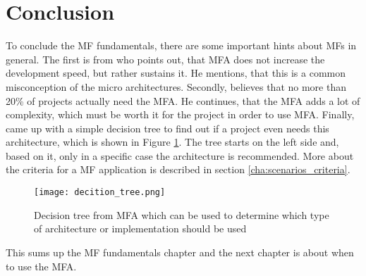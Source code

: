 \section{Conclusion}

To conclude the \ac{MF} fundamentals, there are some important hints about \acp{MF} in general.
The first is from \textcite{Laug.2018b} who points out, that \ac{MFA} does not increase the development speed, but rather sustains it.
He mentions, that this is a common misconception of the micro architectures.
Secondly, \textcite{Leitner.2020} believes that no more than 20\% of projects actually need the \ac{MFA}.
He continues, that the \ac{MFA} adds a lot of complexity, which must be worth it for the project in order to use \ac{MFA}.
Finally, \textcite{Steyer.2019} came up with a simple decision tree to find out if a project even needs this architecture, which is shown in Figure \ref{img:decision_tree}.
The tree starts on the left side and, based on it, only in a specific case the architecture is recommended.
More about the criteria for a \ac{MF} application is described in section \ref{cha:scenarios_criteria}.

\begin{figure}[h]
    \centering
    \texttt{[image: decition\_tree.png]}
    \caption{Decision tree from \ac{MFA} which can be used to determine which type of architecture or implementation should be used \cite{Steyer.2019}}
    \label{img:decision_tree}
\end{figure}

This sums up the \ac{MF} fundamentals chapter and the next chapter is about when to use the \ac{MFA}.


